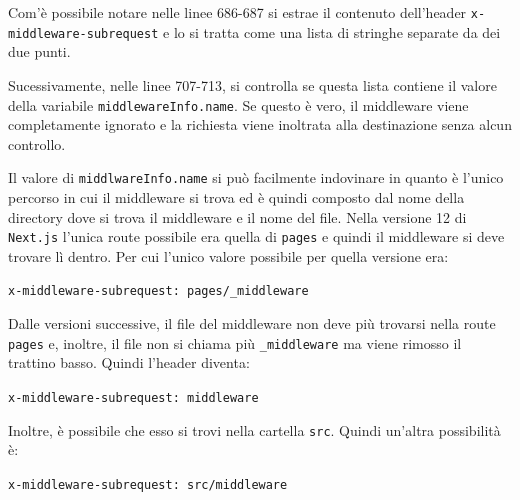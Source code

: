 \documentclass[a4paper,oneside,12pt]{report}
\begin{document}
Com'\`e possibile notare nelle linee 686-687 si estrae il contenuto dell'header \texttt{x-middleware-subrequest} e lo si tratta come una lista di stringhe separate da dei due punti.

Sucessivamente, nelle linee 707-713, si controlla se questa lista contiene il valore della variabile \texttt{middlewareInfo.name}. Se questo \`e vero, il middleware viene completamente ignorato e la richiesta viene inoltrata alla destinazione senza alcun controllo.

Il valore di \texttt{middlwareInfo.name} si pu\`o facilmente indovinare in quanto \`e l'unico percorso in cui il middleware si trova ed \`e quindi composto dal nome della directory dove si trova il middleware e il nome del file. Nella versione 12 di \texttt{Next.js} l'unica route possibile era quella di \texttt{pages} e quindi il middleware si deve trovare l\`i dentro. Per cui l'unico valore possibile per quella versione era:
\begin{center}
	\scriptsize
	\texttt{x-middleware-subrequest: pages/\_middleware}
\end{center}

Dalle versioni successive, il file del middleware non deve pi\`u trovarsi nella route \texttt{pages} e, inoltre, il file non si chiama pi\`u \texttt{\_middleware} ma viene rimosso il trattino basso. Quindi l'header diventa:
\begin{center}
	\scriptsize
	\texttt{x-middleware-subrequest: middleware}
\end{center}

Inoltre, \`e possibile che esso si trovi nella cartella \texttt{src}. Quindi un'altra possibilit\`a \`e:
\begin{center}
	\scriptsize
	\texttt{x-middleware-subrequest: src/middleware}
\end{center}
\end{document}
